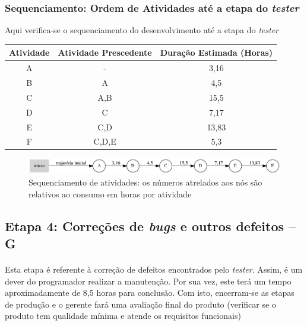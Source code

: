\documentclass[12pt,a4paper]{article}
\begin{document}
		\subsubsection{Sequenciamento: Ordem de Atividades até a etapa do \textit{tester}}
		Aqui verifica-se o sequenciamento do desenvolvimento até a etapa do \textit{tester}
		\begin{table}[!ht]
		\centering
        \begin{tabular}{|c|c|c|}
        \hline 
        Atividade & Atividade Prescedente & Duração Estimada (Horas) \\ 
		 \hline 
		A & - & 3,16 \\ 
		\hline 
		B & A & 4,5 \\         
        \hline 
       
        C & A,B & 15,5 \\ 
        \hline 
        D & C & 7,17 \\ 
        \hline 
        E & C,D & 13,83 \\ 
        \hline 	
        F & C,D,E &  5,3 \\
        \hline
        \end{tabular}	 
		\end{table}
		
		\begin{figure}[ht!]
			\centering
			\includegraphics[scale=0.5]{003.png}
			\caption{Sequenciamento de atividades: os números atrelados aos nós são relativos ao consumo em horas por atividade}
		\end{figure}
		
		
		\subsection{Etapa 4: Correções de \textit{bugs} e outros defeitos -- G}
		\paragraph{} Esta etapa é referente à correção de defeitos encontrados pelo \textit{tester}. Assim, é um dever do programador realizar a manutenção. Por sua vez, este terá um tempo aproximadamente de 8,5 horas para conclusão.	Com isto, encerram-se as etapas de produção e o gerente fará uma avaliação final do produto (verificar se o produto tem qualidade mínima e atende os requisitos funcionais)
\end{document}
